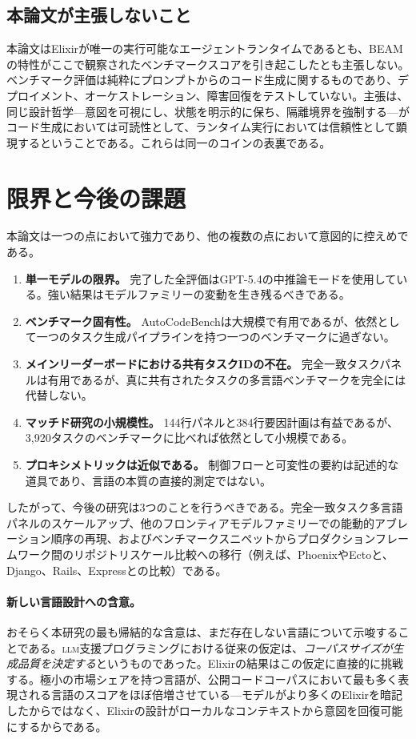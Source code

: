 \documentclass[11pt]{article}
\newcommand{\acb}{AutoCodeBench}
\newcommand{\elixir}{Elixir}
\newcommand{\acro}[1]{\textsc{\MakeLowercase{#1}}}
\begin{document}
\subsection{本論文が主張しないこと}

本論文は\elixir{}が唯一の実行可能なエージェントランタイムであるとも、BEAMの特性がここで観察されたベンチマークスコアを引き起こしたとも主張しない。ベンチマーク評価は純粋にプロンプトからのコード生成に関するものであり、デプロイメント、オーケストレーション、障害回復をテストしていない。主張は、同じ設計哲学---意図を可視にし、状態を明示的に保ち、隔離境界を強制する---がコード生成においては可読性として、ランタイム実行においては信頼性として顕現するということである。これらは同一のコインの表裏である。

\section{限界と今後の課題}

本論文は一つの点において強力であり、他の複数の点において意図的に控えめである。

\begin{enumerate}
  \item \textbf{単一モデルの限界。} 完了した全評価はGPT-5.4の中推論モードを使用している。強い結果はモデルファミリーの変動を生き残るべきである。
  \item \textbf{ベンチマーク固有性。} \acb{}は大規模で有用であるが、依然として一つのタスク生成パイプラインを持つ一つのベンチマークに過ぎない。
  \item \textbf{メインリーダーボードにおける共有タスクIDの不在。} 完全一致タスクパネルは有用であるが、真に共有されたタスクの多言語ベンチマークを完全には代替しない。
  \item \textbf{マッチド研究の小規模性。} 144行パネルと384行要因計画は有益であるが、3,920タスクのベンチマークに比べれば依然として小規模である。
  \item \textbf{プロキシメトリックは近似である。} 制御フローと可変性の要約は記述的な道具であり、言語の本質の直接的測定ではない。
\end{enumerate}

したがって、今後の研究は3つのことを行うべきである。完全一致タスク多言語パネルのスケールアップ、他のフロンティアモデルファミリーでの能動的アブレーション順序の再現、およびベンチマークスニペットからプロダクションフレームワーク間のリポジトリスケール比較への移行（例えば、PhoenixやEctoと、Django、Rails、Expressとの比較）である。

\paragraph{新しい言語設計への含意。}
おそらく本研究の最も帰結的な含意は、まだ存在しない言語について示唆することである。\acro{LLM}支援プログラミングにおける従来の仮定は、\emph{コーパスサイズが生成品質を決定する}というものであった。\elixir{}の結果はこの仮定に直接的に挑戦する。極小の市場シェアを持つ言語が、公開コードコーパスにおいて最も多く表現される言語のスコアをほぼ倍増させている---モデルがより多くの\elixir{}を暗記したからではなく、\elixir{}の設計がローカルなコンテキストから意図を回復可能にするからである。
\end{document}
